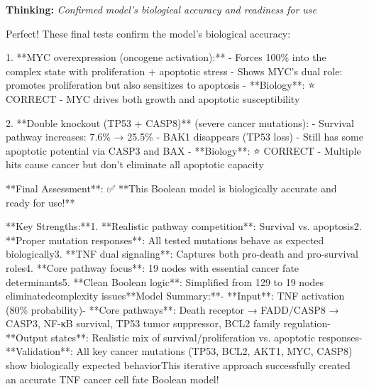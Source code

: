 \documentclass[11pt,a4paper]{article}
\begin{document}
\begin{thinkbox}
\textbf{Thinking:} \textit{Confirmed model's biological accuracy and readiness for use}

Perfect! These final tests confirm the model's biological accuracy:

1. **MYC overexpression (oncogene activation):**   - Forces 100\% into the complex state with proliferation + apoptotic stress   - Shows MYC's dual role: promotes proliferation but also sensitizes to apoptosis
   - **Biology**: ⭐ CORRECT - MYC drives both growth and apoptotic susceptibility

2. **Double knockout (TP53 + CASP8)** (severe cancer mutations):   - Survival pathway increases: 7.6\% → 25.5\%   - BAK1 disappears (TP53 loss)   - Still has some apoptotic potential via CASP3 and BAX   - **Biology**: ⭐ CORRECT - Multiple hits cause cancer but don't eliminate all apoptotic capacity

**Final Assessment**: ✅ **This Boolean model is biologically accurate and ready for use!**

**Key Strengths:**1. **Realistic pathway competition**: Survival vs. apoptosis2. **Proper mutation responses**: All tested mutations behave as expected biologically3. **TNF dual signaling**: Captures both pro-death and pro-survival roles4. **Core pathway focus**: 19 nodes with essential cancer fate determinants5. **Clean Boolean logic**: Simplified from 129 to 19 nodes eliminatedcomplexity issues**Model Summary:**- **Input**: TNF activation (80\% probability)- **Core pathways**: Death receptor → FADD/CASP8 → CASP3, NF-κB survival, TP53 tumor suppressor, BCL2 family regulation- **Output states**: Realistic mix of survival/proliferation vs. apoptotic responses- **Validation**: All key cancer mutations (TP53, BCL2, AKT1, MYC, CASP8) show biologically expected behaviorThis iterative approach successfully created an accurate TNF cancer cell fate Boolean model!

\end{thinkbox}
\end{document}
